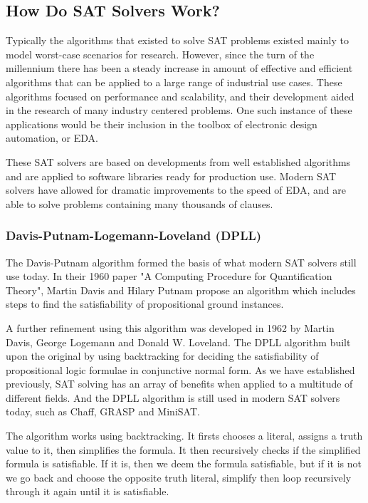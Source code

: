 \documentclass{article}
\begin{document}
\subsection{How Do SAT Solvers Work?}
Typically the algorithms that existed to solve SAT problems existed mainly to model worst-case scenarios for research. However, since the
turn of the millennium there has been a steady increase in amount of effective and efficient algorithms that can be applied to a large
range of industrial use cases. These algorithms focused on performance and scalability, and their development aided in the research of
many industry centered problems. One such instance of these applications would be their inclusion in the toolbox of electronic design
automation, or EDA.

These SAT solvers are based on developments from well established algorithms and are applied to software libraries ready for production use.
Modern SAT solvers have allowed for dramatic improvements to the speed of EDA, and are able to solve problems containing many thousands of
clauses\cite{sat}.

    \subsubsection{Davis-Putnam-Logemann-Loveland (DPLL)}
    The Davis-Putnam algorithm formed the basis of what modern SAT solvers still use today. In their 1960 paper "A Computing Procedure for
    Quantification Theory"\cite{putnam}, Martin Davis and Hilary Putnam propose an algorithm which includes steps to find the satisfiability of
    propositional ground instances.

    A further refinement using this algorithm was developed in 1962 by Martin Davis, George Logemann and Donald W. Loveland. The
    DPLL algorithm built upon the original by using backtracking for deciding the satisfiability of propositional logic formulae in
    conjunctive normal form\cite{dpll}. As we have established previously, SAT solving has an array of benefits when applied to a multitude of
    different fields. And the DPLL algorithm is still used in modern SAT solvers today, such as Chaff, GRASP and MiniSAT.

    The algorithm works using backtracking. It firsts chooses a literal, assigns a truth value to it, then simplifies the formula. It then
    recursively checks if the simplified formula is satisfiable. If it is, then we deem the formula satisfiable, but if it is not we go back
    and choose the opposite truth literal, simplify then loop recursively through it again until it is satisfiable.
\end{document}
